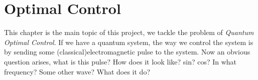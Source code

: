 \documentclass[english, a4paper, 12pt, twoside]{article}
\numberwithin{equation}{section} %
\begin{document}

\newpage
\section{Optimal Control}\label{chap:optimal}
This chapter is the main topic of this project, we tackle the problem of \textit{Quantum Optimal Control}. If we have a quantum system, the way we control the system is by sending some (classical)electromagnetic pulse to the system. Now an obvious question arises, what is this pulse? How does it look like? sin? cos? In what frequency? Some other wave? What does it do?
\end{document}
